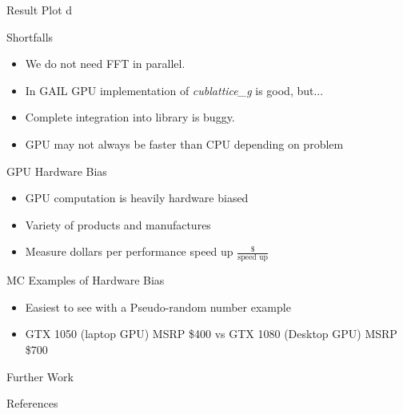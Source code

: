 \documentclass[11pt]{beamer}
\begin{document}
\begin{frame}{Result Plot}
d
\end{frame}

\begin{frame}{Shortfalls}
\begin{itemize}
\item We do not need FFT in parallel.
\item In GAIL GPU implementation of \textit{cublattice\_g} is good, but...
\item Complete integration into library is buggy.
\item GPU may not always be faster than CPU depending on problem
\end{itemize}
\end{frame}

\begin{frame}{GPU Hardware Bias}
\begin{itemize}
\item GPU computation is heavily hardware biased
\item Variety of products and manufactures
\item Measure dollars per performance speed up $\frac{\$}{\text{speed up}}$
\end{itemize}
\end{frame}

\begin{frame}{MC Examples of Hardware Bias}%
\begin{itemize}
\item Easiest to see with a Pseudo-random number example
\item GTX 1050 (laptop GPU) MSRP \$400 vs GTX 1080 (Desktop GPU) MSRP \$700
\end{itemize}
\end{frame}

\begin{frame}{Further Work}

\end{frame}
\begin{frame}{References}


\end{frame}
\end{document}
